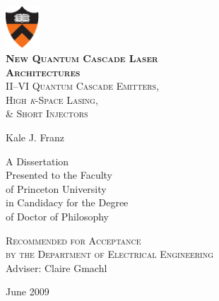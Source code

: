 \addtolength{\textheight}{0.6in}

\thispagestyle{empty}
\vspace*{-0.6in}
\begin{center}
  \includegraphics[width=0.5in]{PrincetonShield}\\
  \vspace{0.2in}
  \huge \textsc{\textbf{New Quantum Cascade Laser\\Architectures}}\\
  \vspace{0.2in}
  \textsc{\Large II--VI Quantum Cascade Emitters,\\High \emph{k}-Space Lasing,\\
  \vspace{-0.12in}
  \& Short Injectors}
\end{center}
\vspace{.4in}
\begin{center}
  \Large Kale J. Franz
\end{center}
\vspace{.4in}
\begin{center}
\sc
    A Dissertation \\
    Presented to the Faculty \\
    of Princeton University \\
    in Candidacy for the Degree \\
    of Doctor of Philosophy
\end{center}
\vspace{.3in}
\begin{center}
\textsc{
    Recommended for Acceptance \\
    by the Department of Electrical Engineering}\\
    \vspace*{0.1in}
    Adviser: Claire Gmachl
\end{center}
\vspace*{0.9in}
\begin{center}
    June 2009
\end{center}
\clearpage


